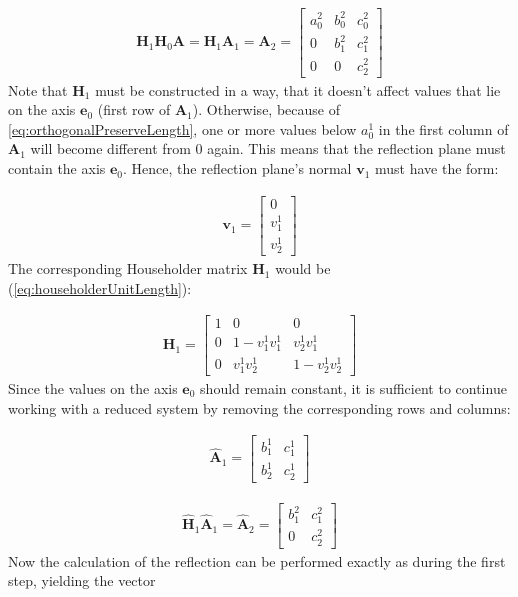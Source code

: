 \begin{align}
\mathbf{H}_1\mathbf{H}_0\mathbf{A} 
= 
\mathbf{H}_1\mathbf{A}_1
= 
\mathbf{A}_2
=
\begin{bmatrix}
a_0^2&b_0^2&c_0^2\\
0    &b_1^2&c_1^2\\
0    &0    &c_2^2
\end{bmatrix}					  
\end{align}
%
Note that $\mathbf{H}_1$ must be constructed in a way, that it doesn't affect values that lie on the axis $\mathbf{e}_0$ (first row of $\mathbf{A}_1$).
Otherwise, because of \cref{eq:orthogonalPreserveLength}, one or more values below $a_0^1$ in the first column of $\mathbf{A}_1$ will become different from 0 again.
This means that the reflection plane must contain the axis $\mathbf{e}_0$.
Hence, the reflection plane's normal $\mathbf{v}_1$ must have the form: 

\begin{align}
\label{eq:qrReflectionVector1Requirement}
\mathbf{v}_1
= 
\begin{bmatrix}
0\\
v_1^1\\
v_2^1
\end{bmatrix}
\end{align}
%
The corresponding Householder matrix $\mathbf{H}_1$ would be (\cref{eq:householderUnitLength}):

\begin{align}
\mathbf{H}_1
=
\begin{bmatrix}
1    &0            &0       \\
0    &1- v_1^1v_1^1&  v_2^1v_1^1\\
0    &   v_1^1v_2^1&1-v_2^1v_2^1
\end{bmatrix}					  
\end{align}
%
Since the values on the axis $\mathbf{e}_0$ should remain constant, it is sufficient to continue working with a reduced system by removing the corresponding rows and columns:

\begin{align}
\mathbf{\hat{A}}_1
=
\begin{bmatrix}
b_1^1&c_1^1\\
b_2^1&c_2^1
\end{bmatrix}					  
\end{align}


\begin{align}
\mathbf{\hat{H}}_1\mathbf{\hat{A}}_1
= 
\mathbf{\hat{A}}_2
=
\begin{bmatrix}
b_1^2&c_1^2\\
0    &c_2^2
\end{bmatrix}					  
\end{align}
%
Now the calculation of the reflection can be performed exactly as during the first step, yielding the vector 

